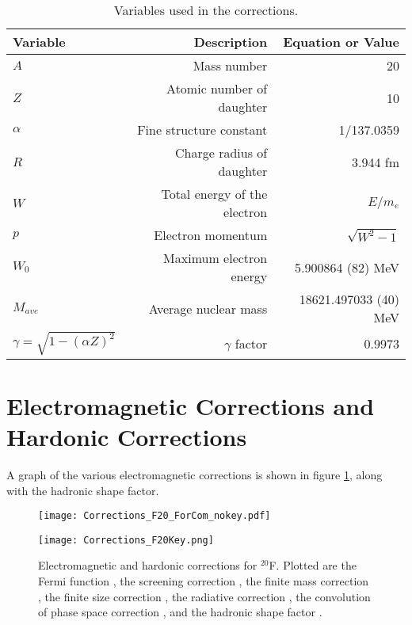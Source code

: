 \documentclass[../MaxHughesThesis.tex]{subfiles}
\begin{document}
\begin{table}[!hbt]
	\centering
	\caption{Variables used in the corrections.}
		\begin{tabular}{lrr}
		Variable & Description & Equation or Value \\ \hline		
		$A$ & Mass number & 20 \\ 
		$Z$ & Atomic number of daughter & 10 \\
		$\alpha$ & Fine structure constant & 1/137.0359\\
		$R$ & Charge radius of daughter & 3.944 fm \cite{Ang13} \\
		$W$ & Total energy of the electron & $E/m_{e}$ \\
		$p$ & Electron momentum & $\sqrt{W^{2} - 1}$ \\
		$W_{0}$ & Maximum electron energy &  5.900864 (82) MeV \\ 
		$M_{ave}$ & Average nuclear mass &  18621.497033 (40) MeV  \\
		$\gamma = \sqrt{1 - (\alpha Z)^{2}} $ & $\gamma$ factor & 0.9973 
		\end{tabular}
	\label{tab:vars}
\end{table}



\section{Electromagnetic Corrections and Hardonic Corrections}
A graph of the various electromagnetic corrections is shown in figure \ref{fig:corrections}, along with the hadronic shape factor. 

\begin{figure}
    \centering
    \begin{minipage}{0.65\textwidth}
        \centerline{\texttt{[image: Corrections\_F20\_ForCom\_nokey.pdf]}} %
    \end{minipage}\hfill
    \begin{minipage}{0.35\textwidth}
        \centerline{\texttt{[image: Corrections\_F20Key.png]}}
    \end{minipage}
    \caption{Electromagnetic and hardonic corrections for $^{20}$F.
	     Plotted are the Fermi function \cite{Wil89}, the screening correction \cite{Buh84}, the finite mass correction \cite{WIL90}, the finite size correction \cite{WIL90}, the radiative correction \cite{Fay86}, the convolution of phase space correction \cite{WIL90}, and the hadronic shape factor \cite{Cal77}.}
    \label{fig:corrections}
\end{figure}
\end{document}
